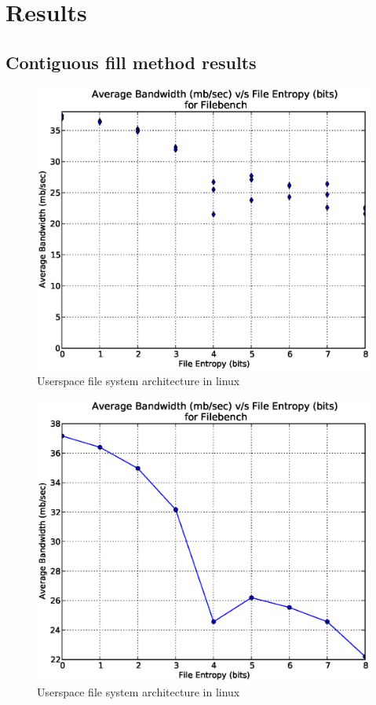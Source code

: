 \chapter{Results}\label{chap:res}

\section{Contiguous fill method results}

\begin{figure}
\label{fig:fuse}
\begin{center}
\includegraphics[scale=.55]{../results/write_bw_all.eps}
\caption{Userspace file system architecture in linux\cite{web:wiki-fuse}}
\end{center}
\end{figure}

\begin{figure}
\label{fig:fuse}
\begin{center}
\includegraphics[scale=.55]{../results/write_bw_avg.eps}
\caption{Userspace file system architecture in linux\cite{web:wiki-fuse}}
\end{center}
\end{figure}


